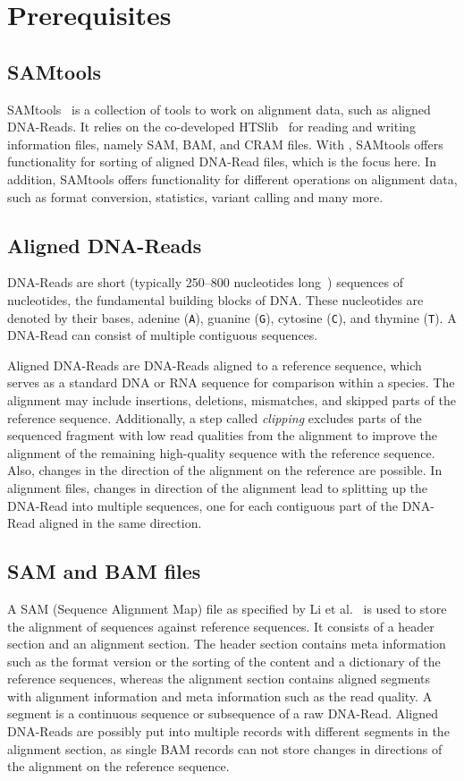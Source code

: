 \section{Prerequisites}

\subsection{SAMtools}
SAMtools~\cite{12ySamtools} is a collection of tools to work on alignment data, such as aligned DNA-Reads. It relies on the co-developed HTSlib~\cite{bonfield_htslib_2021} for reading and writing information files, namely SAM, BAM, and CRAM files. With \sort, SAMtools offers functionality for sorting of aligned DNA-Read files, which is the focus here. In addition, SAMtools offers functionality for different operations on alignment data, such as format conversion, statistics, variant calling and many more.

\subsection{Aligned DNA-Reads}
DNA-Reads are short (typically 250–800 nucleotides long~\cite{hu_next-generation_2021}) sequences of nucleotides, the fundamental building blocks of DNA. These nucleotides are denoted by their bases, adenine (\texttt{A}), guanine (\texttt{G}), cytosine (\texttt{C}), and thymine (\texttt{T}). A DNA-Read can consist of multiple contiguous sequences. 

Aligned DNA-Reads are DNA-Reads aligned to a reference sequence, which serves as
a standard DNA or RNA sequence for comparison within a species. The alignment may include insertions, deletions, mismatches, and skipped parts of the reference sequence. Additionally, a step called \textit{clipping} excludes parts of the sequenced fragment with low read qualities from the alignment to improve the alignment of the remaining high-quality sequence with the reference sequence. Also, changes in the direction of the alignment on the reference are possible. In alignment files, changes in direction of the alignment lead to splitting up the DNA-Read into multiple sequences, one for each contiguous part of the DNA-Read aligned in the same direction.

\subsection{SAM and BAM files}
A SAM (Sequence Alignment Map) file as specified by Li et al.~\cite{samformat} is used to store the alignment of sequences against reference sequences. It consists of a header section and an alignment section. The header section contains meta information such as the format version or the sorting of the content and a dictionary of the reference sequences, whereas the alignment section contains aligned segments with alignment information and meta information such as the read quality. A segment is a continuous sequence or subsequence of a raw DNA-Read. Aligned DNA-Reads are possibly put into multiple records with different segments in the alignment section, as single BAM records can not store changes in directions of the alignment on the reference sequence.

